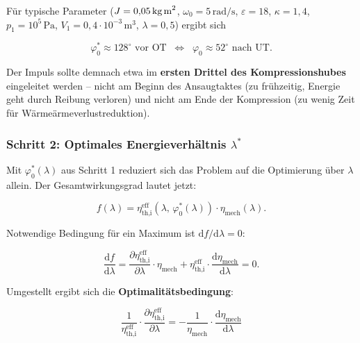 ﻿\documentclass[a4paper,12pt]{article}
\begin{document}
Für typische Parameter ($J = 0{,}05\,\text{kg\,m}^2$, $\omega_0 = 5\,\text{rad/s}$,
$\varepsilon = 18$, $\kappa = 1{,}4$, $p_1 = 10^5\,\text{Pa}$,
$V_1 = 0{,}4 \cdot 10^{-3}\,\text{m}^3$, $\lambda = 0{,}5$) ergibt sich

\begin{equation}
  \varphi_0^* \approx 128^\circ\text{ vor OT} \;\; \Leftrightarrow \;\;
    \varphi_0 \approx 52^\circ\text{ nach UT}.
  \label{eq:phi0_num}
\end{equation}

Der Impuls sollte demnach etwa im \textbf{ersten Drittel des Kompressionshubes}
eingeleitet werden -- nicht am Beginn des Ansaugtaktes (zu frühzeitig, Energie
geht durch Reibung verloren) und nicht am Ende der Kompression (zu wenig Zeit
für Wärmeärmeverlustreduktion).

\subsubsection*{Schritt 2: Optimales Energieverhältnis $\lambda^*$}

Mit $\varphi_0^*(\lambda)$ aus Schritt 1 reduziert sich das Problem auf die
Optimierung über $\lambda$ allein. Der Gesamtwirkungsgrad lautet jetzt:

\begin{equation}
  f(\lambda) = \eta_\text{th,i}^\text{eff}\!\left(\lambda,\, \varphi_0^*(\lambda)\right)
    \cdot \eta_\text{mech}(\lambda).
  \label{eq:f_lambda}
\end{equation}

Notwendige Bedingung für ein Maximum ist $\mathrm{d}f/\mathrm{d}\lambda = 0$:

\begin{equation}
  \frac{\mathrm{d}f}{\mathrm{d}\lambda} =
    \frac{\partial \eta_\text{th,i}^\text{eff}}{\partial \lambda} \cdot \eta_\text{mech}
    + \eta_\text{th,i}^\text{eff} \cdot \frac{\mathrm{d}\eta_\text{mech}}{\mathrm{d}\lambda}
    = 0.
  \label{eq:dfunc}
\end{equation}

Umgestellt ergibt sich die \textbf{Optimalitätsbedingung}:

\begin{equation}
  \boxed{
  \frac{1}{\eta_\text{th,i}^\text{eff}} \cdot
    \frac{\partial \eta_\text{th,i}^\text{eff}}{\partial \lambda}
  = -\frac{1}{\eta_\text{mech}} \cdot
    \frac{\mathrm{d}\eta_\text{mech}}{\mathrm{d}\lambda}
  }
  \label{eq:optbed}
\end{equation}
\end{document}

